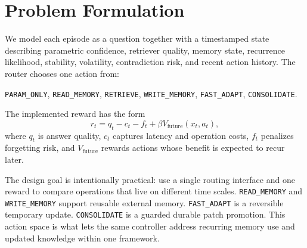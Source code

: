 \section{Problem Formulation}

We model each episode as a question together with a timestamped state describing parametric confidence, retriever quality, memory state, recurrence likelihood, stability, volatility, contradiction risk, and recent action history. The router chooses one action from:
\begin{center}
\texttt{PARAM\_ONLY}, \texttt{READ\_MEMORY}, \texttt{RETRIEVE}, \texttt{WRITE\_MEMORY}, \texttt{FAST\_ADAPT}, \texttt{CONSOLIDATE}.
\end{center}

The implemented reward has the form
\[
r_t = q_t - c_t - f_t + \beta V_{\text{future}}(x_t, a_t),
\]
where $q_t$ is answer quality, $c_t$ captures latency and operation costs, $f_t$ penalizes forgetting risk, and $V_{\text{future}}$ rewards actions whose benefit is expected to recur later.

The design goal is intentionally practical: use a single routing interface and one reward to compare operations that live on different time scales. \texttt{READ\_MEMORY} and \texttt{WRITE\_MEMORY} support reusable external memory. \texttt{FAST\_ADAPT} is a reversible temporary update. \texttt{CONSOLIDATE} is a guarded durable patch promotion. This action space is what lets the same controller address recurring memory use and updated knowledge within one framework.
